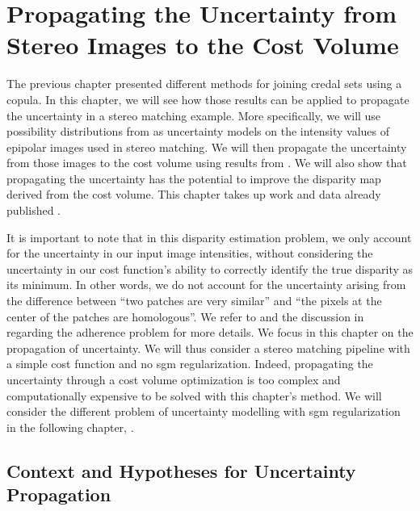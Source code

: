 \chapter{Propagating the Uncertainty from Stereo Images to the Cost Volume}\label{chap:propagating}
The previous chapter presented different methods for joining credal sets using a copula. In this chapter, we will see how those results can be applied to propagate the uncertainty in a stereo matching example. More specifically, we will use possibility distributions from  as uncertainty models on the intensity values of epipolar images used in stereo matching. We will then propagate the uncertainty from those images to the cost volume using results from . We will also show that propagating the uncertainty has the potential to improve the disparity map derived from the cost volume. This chapter takes up work and data already published \cite{malinowski_copulas_2022, malinowski_uncertainty_2023}.

It is important to note that in this disparity estimation problem, we only account for the uncertainty in our input image intensities, without considering the uncertainty in our cost function's ability to correctly identify the true disparity as its minimum. In other words, we do not account for the uncertainty arising from the difference between ``two patches are very similar'' and ``the pixels at the center of the patches are homologous''. We refer to  and the discussion in  regarding the adherence problem for more details. We focus in this chapter on the propagation of uncertainty. We will thus consider a stereo matching pipeline with a simple cost function and no \acrshort{sgm} regularization. Indeed, propagating the uncertainty through a cost volume optimization is too complex and computationally expensive to be solved with this chapter's method. We will consider the different problem of uncertainty modelling with \acrshort{sgm} regularization in the following chapter, . 

\section{Context and Hypotheses for Uncertainty Propagation }\label{sec:sources_of_uncertainty}
